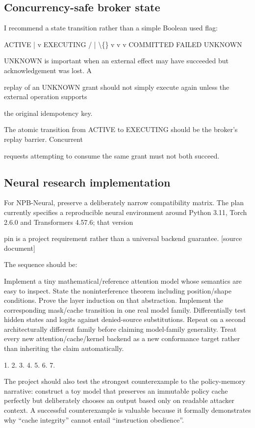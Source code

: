\documentclass[11pt,a4paper]{article}
\begin{document}
\subsection*{Concurrency-safe broker state}
I recommend a state transition rather than a simple Boolean used  flag:\par
ACTIVE | v EXECUTING /   |    \textbackslash\{\} v    v     v COMMITTED FAILED UNKNOWN\par
UNKNOWN  is important when an external effect may have succeeded but acknowledgement was lost. A\par
replay of an UNKNOWN  grant should not simply execute again unless the external operation supports\par
the original idempotency key.\par
The atomic transition from ACTIVE  to EXECUTING  should be the broker's replay barrier. Concurrent\par
requests attempting to consume the same grant must not both succeed.\par
\subsection*{Neural research implementation}
For NPB-Neural, preserve a deliberately narrow compatibility matrix. The plan currently specifies a reproducible neural environment around Python 3.11, Torch 2.6.0 and Transformers 4.57.6; that version\par
pin is a project requirement rather than a universal backend guarantee. [source document]\par
The sequence should be:\par
Implement a tiny mathematical/reference attention model whose semantics are easy to inspect. State the noninterference theorem including position/shape conditions. Prove the layer induction on that abstraction. Implement the corresponding mask/cache transition in one real model family. Differentially test hidden states and logits against denied-source substitutions. Repeat on a second architecturally different family before claiming model-family generality. Treat every new attention/cache/kernel backend as a new conformance target rather than inheriting the claim automatically.\par
1. 2. 3. 4. 5. 6. 7.\par
The project should also test the strongest counterexample to the policy-memory narrative: construct a toy model that preserves an immutable policy cache perfectly but deliberately chooses an output based only on readable attacker context. A successful counterexample is valuable because it formally demonstrates why “cache integrity” cannot entail “instruction obedience”.\par
\end{document}
